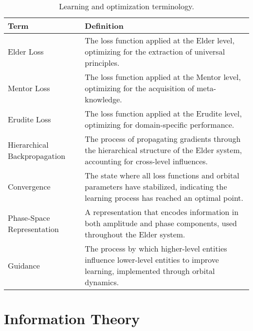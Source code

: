 \begin{table}[h]
\centering
\begin{tabular}{|l|p{12cm}|}
\hline
\textbf{Term} & \textbf{Definition} \\
\hline
Elder Loss & The loss function applied at the Elder level, optimizing for the extraction of universal principles. \\
\hline
Mentor Loss & The loss function applied at the Mentor level, optimizing for the acquisition of meta-knowledge. \\
\hline
Erudite Loss & The loss function applied at the Erudite level, optimizing for domain-specific performance. \\
\hline
Hierarchical Backpropagation & The process of propagating gradients through the hierarchical structure of the Elder system, accounting for cross-level influences. \\
\hline
Convergence & The state where all loss functions and orbital parameters have stabilized, indicating the learning process has reached an optimal point. \\
\hline
Phase-Space Representation & A representation that encodes information in both amplitude and phase components, used throughout the Elder system. \\
\hline
Guidance & The process by which higher-level entities influence lower-level entities to improve learning, implemented through orbital dynamics. \\
\hline
\end{tabular}
\caption{Learning and optimization terminology.}
\label{tab:learning_terminology}
\end{table}

\section{Information Theory}

